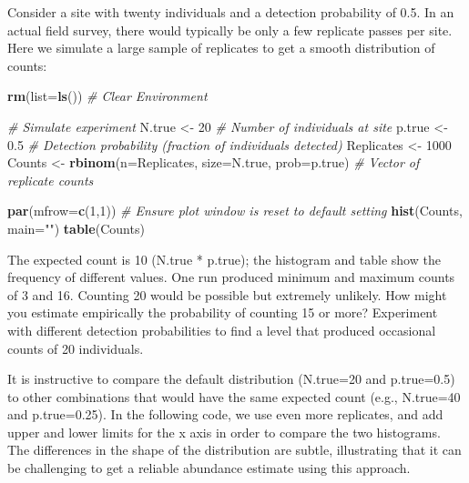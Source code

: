 \documentclass[
]{krantz}
\makeatletter
\newenvironment{Shaded}{\begin{snugshade}}{\end{snugshade}}
\newcommand{\AttributeTok}[1]{\textcolor[rgb]{0.27,0.27,0.27}{#1}}
\newcommand{\CommentTok}[1]{\textcolor[rgb]{0.37,0.37,0.37}{\textit{#1}}}
\newcommand{\DecValTok}[1]{\textcolor[rgb]{0.06,0.06,0.06}{#1}}
\newcommand{\FloatTok}[1]{\textcolor[rgb]{0.06,0.06,0.06}{#1}}
\newcommand{\FunctionTok}[1]{\textcolor[rgb]{0.27,0.27,0.27}{\textbf{#1}}}
\newcommand{\NormalTok}[1]{#1}
\newcommand{\OtherTok}[1]{\textcolor[rgb]{0.37,0.37,0.37}{#1}}
\newcommand{\StringTok}[1]{\textcolor[rgb]{0.5,0.5,0.5}{#1}}
\newenvironment{kframe}{%
\medskip{}
\setlength{\fboxsep}{.8em}
 \def\at@end@of@kframe{}%
 \ifinner\ifhmode%
  \def\at@end@of@kframe{\end{minipage}}%
  \begin{minipage}{\columnwidth}%
 \fi\fi%
 \def\FrameCommand##1{\hskip\@totalleftmargin \hskip-\fboxsep
 \colorbox{shadecolor}{##1}\hskip-\fboxsep
     \hskip-\linewidth \hskip-\@totalleftmargin \hskip\columnwidth}%
 \MakeFramed {\advance\hsize-\width
   \@totalleftmargin\z@ \linewidth\hsize
   \@setminipage}}%
 {\par\unskip\endMakeFramed%
 \at@end@of@kframe}
\renewenvironment{Shaded}{\begin{kframe}}{\end{kframe}}
\makeatother
\begin{document}
Consider a site with twenty individuals and a detection probability of 0.5. In an actual field survey, there would typically be only a few replicate passes per site. Here we simulate a large sample of replicates to get a smooth distribution of counts:

\begin{Shaded}
\begin{Highlighting}[]
\FunctionTok{rm}\NormalTok{(}\AttributeTok{list=}\FunctionTok{ls}\NormalTok{()) }\CommentTok{\# Clear Environment}

\CommentTok{\# Simulate experiment}
\NormalTok{N.true }\OtherTok{\textless{}{-}} \DecValTok{20}  \CommentTok{\# Number of individuals at site}
\NormalTok{p.true }\OtherTok{\textless{}{-}} \FloatTok{0.5} \CommentTok{\# Detection probability (fraction of individuals detected)}
\NormalTok{Replicates }\OtherTok{\textless{}{-}} \DecValTok{1000}
\NormalTok{Counts }\OtherTok{\textless{}{-}} \FunctionTok{rbinom}\NormalTok{(}\AttributeTok{n=}\NormalTok{Replicates, }\AttributeTok{size=}\NormalTok{N.true, }\AttributeTok{prob=}\NormalTok{p.true) }\CommentTok{\# Vector of replicate counts}

\FunctionTok{par}\NormalTok{(}\AttributeTok{mfrow=}\FunctionTok{c}\NormalTok{(}\DecValTok{1}\NormalTok{,}\DecValTok{1}\NormalTok{)) }\CommentTok{\# Ensure plot window is reset to default setting}
\FunctionTok{hist}\NormalTok{(Counts, }\AttributeTok{main=}\StringTok{""}\NormalTok{)}
\FunctionTok{table}\NormalTok{(Counts)}
\end{Highlighting}
\end{Shaded}

The expected count is 10 (N.true * p.true); the histogram and table show the frequency of different values. One run produced minimum and maximum counts of 3 and 16. Counting 20 would be possible but extremely unlikely. How might you estimate empirically the probability of counting 15 or more? Experiment with different detection probabilities to find a level that produced occasional counts of 20 individuals.

It is instructive to compare the default distribution (N.true=20 and p.true=0.5) to other combinations that would have the same expected count (e.g., N.true=40 and p.true=0.25). In the following code, we use even more replicates, and add upper and lower limits for the x axis in order to compare the two histograms. The differences in the shape of the distribution are subtle, illustrating that it can be challenging to get a reliable abundance estimate using this approach.
\end{document}

